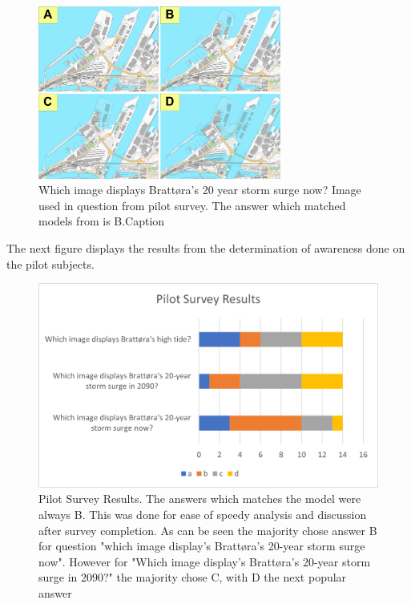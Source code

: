 \begin{figure}[h]
    \centering
    \includegraphics[width=8cm]{fig/brattora question on 2022 20 yr storm surge quadrant.png}
    \caption{Which image displays Brattøra's 20 year storm surge now? Image used in question from pilot survey. The answer which matched models from \cite{kartverket_se_2021} is B.Caption}
    \label{fig:brattora_2022_stormsurge}
\end{figure}

The next figure displays the results from the determination of awareness done on the pilot subjects.

\begin{figure}[h!]
    \centering
    \includegraphics{fig_results/pilot-survey-results.png}
    \caption{Pilot Survey Results. The answers which matches the model \cite{kartverket_se_2021} were always B. This was done for ease of speedy analysis and discussion after survey completion. As can be seen the majority chose answer B for question "which image display's Brattøra's 20-year storm surge now". However for "Which image display's Brattøra's 20-year storm surge in 2090?" the majority chose C, with D the next popular answer   }
    \label{fig:pilot_survey_results}
\end{figure}

